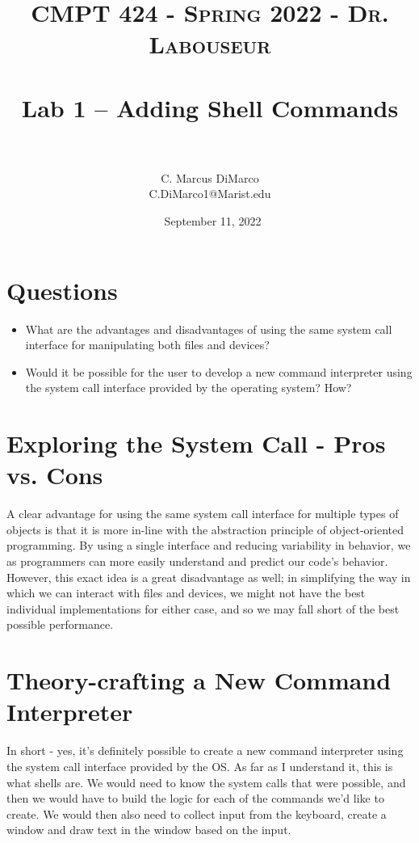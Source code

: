 \documentclass[letterpaper, 10pt]{article}
\title{	
   \normalfont \normalsize 
   \textsc{CMPT 424 - Spring 2022 - Dr. Labouseur} \\[10pt] %
   \horrule{0.5pt} \\[0.25cm] 	%
   \huge Lab 1 -- Adding Shell Commands \\     	    %
   \horrule{0.5pt} \\[0.25cm] 	%
}
\author{C. Marcus DiMarco \\ \normalsize C.DiMarco1@Marist.edu}
\date{\normalsize\ September 11, 2022} 	%
\begin{document}
\maketitle %



\section{Questions}

\begin{itemize}
    \item \hspace{0.5em}What are the advantages and disadvantages of using the same system call interface for manipulating both files and devices?
    \item \hspace{0.5em}Would it be possible for the user to develop a new command interpreter using the system call interface provided by the operating system? How?
\end{itemize}


\section{Exploring the System Call - Pros vs. Cons}

\hspace{1.0em}A clear advantage for using the same system call interface for multiple types of objects is that it is more in-line with the abstraction principle of object-oriented programming. By using a single interface and reducing variability in behavior, we as programmers can more easily understand and predict our code's behavior. However, this exact idea is a great disadvantage as well; in simplifying the way in which we can interact with files and devices, we might not have the best individual implementations for either case, and so we may fall short of the best possible performance.

\section{Theory-crafting a New Command Interpreter}

\hspace{1.0em}In short - yes, it's definitely possible to create a new command interpreter using the system call interface provided by the OS. As far as I understand it, this is what shells are. We would need to know the system calls that were possible, and then we would have to build the logic for each of the commands we'd like to create.  We would then also need to collect input from the keyboard, create a window and draw text in the window based on the input.
\end{document}
